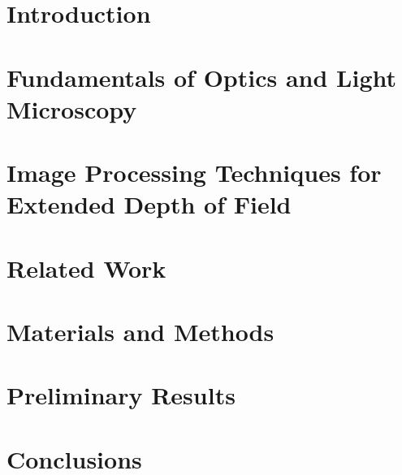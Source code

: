 \documentclass[mestrado, qualificacao]{packages/icmc}
\begin{document}
\textual

\chapter{Introduction}
\label{chapter:introduction}


\chapter{Fundamentals of Optics and Light Microscopy}
\label{chapter:fundamentals-of-optics-and-light-microscopy}


\chapter{Image Processing Techniques for Extended Depth of Field}
\label{chapter:image-processing}


\chapter{Related Work}
\label{chapter:related-work}


\chapter{Materials and Methods}
\label{chapter:materials-and-methods}


\chapter{Preliminary Results}
\label{chapter:preliminary-results}


\chapter{Conclusions}
\label{chapter:conclusions}


% 
\end{document}
